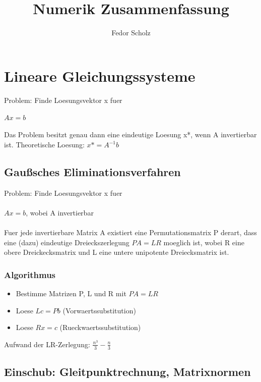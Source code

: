 \documentclass[a4paper]{scrreprt}
\begin{document}
\title{Numerik Zusammenfassung}
\author{Fedor Scholz}
\maketitle

\tableofcontents
\vspace{1cm}

\chapter{Lineare Gleichungssysteme}

Problem: Finde Loesungsvektor x fuer\\\\
$Ax = b$\\\\
Das Problem besitzt genau dann eine eindeutige Loesung x*, wenn A invertierbar ist.
Theoretische Loesung: $x* = A^{-1}b$

\section{Gaußsches Eliminationsverfahren}

Problem: Finde Loesungsvektor x fuer\\\\
$Ax = b$, wobei A invertierbar\\\\
Fuer jede invertierbare Matrix A existiert eine Permutationsmatrix P derart, dass eine (dazu) eindeutige Dreieckszerlegung $PA = LR$ moeglich ist, wobei R eine obere Dreickecksmatrix und L eine untere unipotente Dreiecksmatrix ist.

\subsection{Algorithmus}

\begin{itemize}
	\item Bestimme Matrizen P, L und R mit $PA = LR$
	\item Loese $Lc = Pb$ (Vorwaertssubstitution)
	\item Loese $Rx = c$ (Rueckwaertssubstitution)
\end{itemize}

Aufwand der LR-Zerlegung: $\frac{n^3}{3} - \frac{n}{3}$

\section{Einschub: Gleitpunktrechnung, Matrixnormen}
\end{document}
